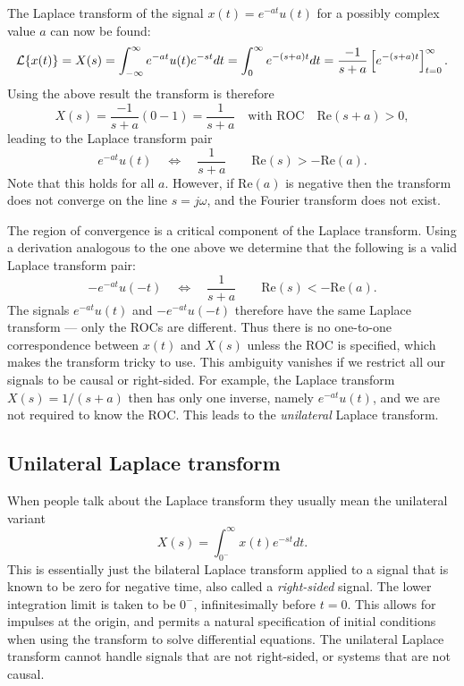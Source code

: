 \documentclass[10pt]{beamer}
\begin{document}
The Laplace transform of the signal $x(t) = e^{-at} u(t)$ for a possibly complex value $a$ can now be found:
\begin{equation*}
  {\cal L} \{ x(t) \} = X(s) = \int_{-\infty}^{\infty} e^{-at} u(t) e^{-st} dt
  = \int_{0}^{\infty} e^{-(s+a)t} dt = \frac{-1}{s+a} \left[ e^{-(s+a)t} \right]_{t=0}^\infty.
\end{equation*}
Using the above result the transform is therefore
\begin{equation*}
  X(s) = \frac{-1}{s+a} (0-1) = \frac{1}{s+a} \quad \text{with ROC} \quad \text{Re}(s+a) > 0,
\end{equation*}
leading to the Laplace transform pair
\begin{equation*}
  e^{-at} u(t) \quad \Longleftrightarrow \quad \frac{1}{s+a} \qquad \text{Re}(s) > - \text{Re}(a).
\end{equation*}
Note that this holds for all $a$.  However, if $ \text{Re}(a)$ is negative then the transform does not converge on the line $s = j \omega$, and the Fourier transform does not exist.

The region of convergence is a critical component of the Laplace transform.  Using a derivation analogous to the one above we determine that the following is a valid Laplace transform pair:
\begin{equation*}
  -e^{-at} u(-t) \quad \Longleftrightarrow \quad \frac{1}{s+a} \qquad \text{Re}(s) < - \text{Re}(a).
\end{equation*}
The signals $e^{-at} u(t)$ and $-e^{-at} u(-t)$ therefore have the same Laplace transform --- only the ROCs are different.  Thus there is no one-to-one correspondence between $x(t)$ and $X(s)$ unless the ROC is specified, which makes the transform tricky to use.  This ambiguity vanishes if we restrict all our signals to be causal or right-sided.  For example, the Laplace transform $X(s) = 1/(s+a)$ then has only one inverse, namely $e^{-at} u(t)$, and we are not required to know the ROC.  This leads to the {\em unilateral} Laplace transform.

\subsection{Unilateral Laplace transform}

When people talk about the Laplace transform they usually mean the unilateral variant
\begin{equation*}
  X(s) = \int_{0^-}^\infty x(t) e^{-st} dt.
\end{equation*}
This is essentially just the bilateral Laplace transform applied to a signal that is known to be zero for negative time, also called a {\em right-sided} signal.  The lower integration limit is taken to be $0^-$, infinitesimally before $t=0$.  This allows for impulses at the origin, and permits a natural specification of initial conditions when using the transform to solve differential equations.  The unilateral Laplace transform cannot handle signals that are not right-sided, or systems that are not causal.
\end{document}
